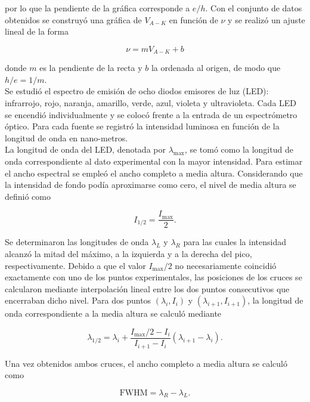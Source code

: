 por lo que la pendiente de la gráfica corresponde a $e/h$. Con el conjunto de datos obtenidos se construyó una gráfica de $V_{A-K}$ en función de $\nu$ y se realizó un ajuste lineal de la forma

\begin{equation}
    \nu = m V_{A-K} + b
\end{equation}

donde $m$ es la pendiente de la recta y $b$ la ordenada al origen, de modo que $h/e= 1/m$.\\


Se estudió el espectro de emisión de ocho diodos emisores de luz
(LED): infrarrojo, rojo, naranja, amarillo, verde, azul, violeta y
ultravioleta. Cada LED se encendió individualmente y se colocó frente a
la entrada de un espectrómetro óptico. Para cada fuente se
registró la intensidad luminosa en función de la longitud de onda en nano-metros.\\

La longitud de onda del LED, denotada por $\lambda_{\max}$, se tomó como
la longitud de onda correspondiente al dato experimental con la mayor
intensidad. Para estimar el ancho espectral se empleó el ancho completo a media
altura. Considerando que la intensidad de fondo podía aproximarse
como cero, el nivel de media altura se definió como

\begin{equation}
    I_{1/2}=\frac{I_{\max}}{2}.
\end{equation}

Se determinaron las longitudes de onda $\lambda_L$ y $\lambda_R$ para
las cuales la intensidad alcanzó la mitad del máximo, a la izquierda y
a la derecha del pico, respectivamente. Debido a que el valor
$I_{\max}/2$ no necesariamente coincidió exactamente con uno de los
puntos experimentales, las posiciones de los cruces se calcularon
mediante interpolación lineal entre los dos puntos consecutivos que
encerraban dicho nivel. Para dos puntos $(\lambda_i,I_i)$ y
$(\lambda_{i+1},I_{i+1})$, la longitud de onda correspondiente a la
media altura se calculó mediante

\begin{equation}
    \lambda_{1/2}
    =
    \lambda_i+
    \frac{I_{\max}/2-I_i}
         {I_{i+1}-I_i}
    \left(\lambda_{i+1}-\lambda_i\right).
\end{equation}

Una vez obtenidos ambos cruces, el ancho completo a media altura se
calculó como

\begin{equation}
    \mathrm{FWHM}=\lambda_R-\lambda_L.
\end{equation}


